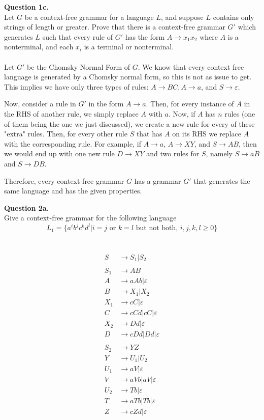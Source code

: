 \documentclass{article}
\newcommand{\set}[1]{\{#1\}}
\renewcommand{\epsilon}{\varepsilon}
\newenvironment{question}[2]
{
    {\large \textbf{Question #1.}}\\
    #2\\\\
}{\newpage}
\begin{document}
\begin{question}
    {1c}{Let $G$ be a context-free grammar for a language $L$, and suppose $L$ contains only strings
        of length  or greater. Prove that there is a context-free grammar $G'$ which generates $L$ such that
        every rule of $G'$ has the form $A \to x_1x_2$ where $A$ is a nonterminal, and each $x_i$ is a
        terminal or nonterminal.}

    Let $G'$ be the Chomsky Normal Form of $G$. We know that every context free language is generated by
    a Chomsky normal form, so this is not as issue to get. This implies we have only three types of rules:
    $A \to BC, A \to a$, and $S \to \epsilon$.

    Now, consider a rule in $G'$ in the form $A \to a$. Then, for every instance of $A$ in the RHS of another rule, we simply
    replace $A$ with $a$. Now, if $A$ has $n$ rules (one of them being the one we just discussed), we create a new rule
    for every of these "extra" rules. Then, for every other rule $S$
    that has $A$ on its RHS we replace $A$ with the corresponding rule. For example,
    if $A \to a$, $A \to XY$, and $S \to AB$, then we would end up with one new rule $D \to XY$ and two rules for $S$, namely $S \to aB$ and $S \to DB$.

    Therefore, every context-free grammar $G$ has a grammar $G'$ that generates the same language and has the given properties.

\end{question}

\begin{question}
    {2a}
    {Give a context-free grammar for the following language
        \[L_1 = \set{a^ib^jc^kd^l | i = j \text{ or } k = l \text{ but not both, } i,j,k,l \geq 0}\]}
    \begin{align*}
        S   & \to S_1 | S_2           \\
        \\
        S_1 & \to AB                  \\
        A   & \to aAb | \epsilon      \\
        B   & \to X_1 | X_2           \\
        X_1 & \to cC | \epsilon       \\
        C   & \to cCd|cC|\epsilon     \\
        X_2 & \to Dd|\epsilon         \\
        D   & \to cDd|Dd|\epsilon     \\
        \\
        S_2 & \to YZ                  \\
        Y   & \to U_1 | U_2           \\
        U_1 & \to aV | \epsilon       \\
        V   & \to aVb|aV|\epsilon     \\
        U_2 & \to Tb | \epsilon       \\
        T   & \to aTb | Tb | \epsilon \\
        Z   & \to cZd|\epsilon
    \end{align*}
\end{question}
\end{document}
